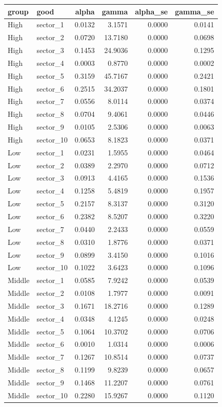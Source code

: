 \begin{tabular}{llrrrr}
\toprule
group & good & alpha & gamma & alpha\_se & gamma\_se \\
\midrule
High & sector\_1 & 0.0132 & 3.1571 & 0.0000 & 0.0141 \\
High & sector\_2 & 0.0720 & 13.7180 & 0.0000 & 0.0698 \\
High & sector\_3 & 0.1453 & 24.9036 & 0.0000 & 0.1295 \\
High & sector\_4 & 0.0003 & 0.8770 & 0.0000 & 0.0002 \\
High & sector\_5 & 0.3159 & 45.7167 & 0.0000 & 0.2421 \\
High & sector\_6 & 0.2515 & 34.2037 & 0.0000 & 0.1801 \\
High & sector\_7 & 0.0556 & 8.0114 & 0.0000 & 0.0374 \\
High & sector\_8 & 0.0704 & 9.4061 & 0.0000 & 0.0446 \\
High & sector\_9 & 0.0105 & 2.5306 & 0.0000 & 0.0063 \\
High & sector\_10 & 0.0653 & 8.1823 & 0.0000 & 0.0371 \\
Low & sector\_1 & 0.0231 & 1.5955 & 0.0000 & 0.0464 \\
Low & sector\_2 & 0.0389 & 2.2970 & 0.0000 & 0.0712 \\
Low & sector\_3 & 0.0913 & 4.4165 & 0.0000 & 0.1536 \\
Low & sector\_4 & 0.1258 & 5.4819 & 0.0000 & 0.1957 \\
Low & sector\_5 & 0.2157 & 8.3137 & 0.0000 & 0.3120 \\
Low & sector\_6 & 0.2382 & 8.5207 & 0.0000 & 0.3220 \\
Low & sector\_7 & 0.0440 & 2.2433 & 0.0000 & 0.0559 \\
Low & sector\_8 & 0.0310 & 1.8776 & 0.0000 & 0.0371 \\
Low & sector\_9 & 0.0899 & 3.4150 & 0.0000 & 0.1016 \\
Low & sector\_10 & 0.1022 & 3.6423 & 0.0000 & 0.1096 \\
Middle & sector\_1 & 0.0585 & 7.9242 & 0.0000 & 0.0539 \\
Middle & sector\_2 & 0.0108 & 1.7977 & 0.0000 & 0.0091 \\
Middle & sector\_3 & 0.1671 & 18.2716 & 0.0000 & 0.1289 \\
Middle & sector\_4 & 0.0348 & 4.1245 & 0.0000 & 0.0248 \\
Middle & sector\_5 & 0.1064 & 10.3702 & 0.0000 & 0.0706 \\
Middle & sector\_6 & 0.0010 & 1.0314 & 0.0000 & 0.0006 \\
Middle & sector\_7 & 0.1267 & 10.8514 & 0.0000 & 0.0737 \\
Middle & sector\_8 & 0.1199 & 9.8239 & 0.0000 & 0.0657 \\
Middle & sector\_9 & 0.1468 & 11.2207 & 0.0000 & 0.0761 \\
Middle & sector\_10 & 0.2280 & 15.9267 & 0.0000 & 0.1120 \\
\bottomrule
\end{tabular}
